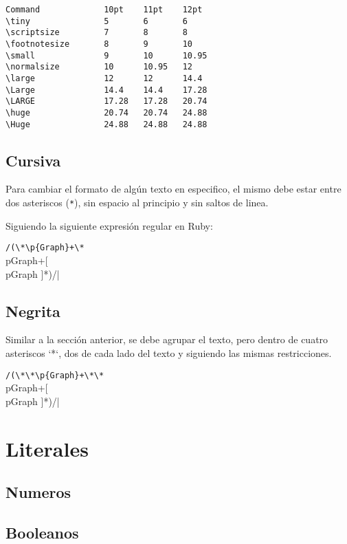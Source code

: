 \documentclass[12pt,letterpaper,titlepage,oneside,openright]{book}
\newcommand{\ttcode}[1]{(\texttt{#1})}
\begin{document}
\begin{verbatim}
Command             10pt    11pt    12pt
\tiny               5       6       6
\scriptsize         7       8       8
\footnotesize       8       9       10
\small              9       10      10.95
\normalsize         10      10.95   12
\large              12      12      14.4
\Large              14.4    14.4    17.28
\LARGE              17.28   17.28   20.74
\huge               20.74   20.74   24.88
\Huge               24.88   24.88   24.88
\end{verbatim}

\subsection{Cursiva}

Para cambiar el formato de algún texto en especifico, el mismo debe estar entre
dos asteriscos \ttcode{*}, sin espacio al principio y sin saltos de linea.

Siguiendo la siguiente expresión regular en Ruby:

\begin{center}
\verb|/(\*\p{Graph}+\*|\*\\p{Graph}+[\\p{Graph} ]*\*)/|
\end{center}

\subsection{Negrita}

Similar a la sección anterior, se debe agrupar el texto, pero dentro de cuatro
asteriscos `*`, dos de cada lado del texto y siguiendo las mismas restricciones.

\begin{center}
\verb|/(\*\*\p{Graph}+\*\*|\*\*\\p{Graph}+[\\p{Graph} ]*\*\*)/|
\end{center}

\section{Literales}

\subsection{Numeros}

\subsection{Booleanos}
\end{document}
